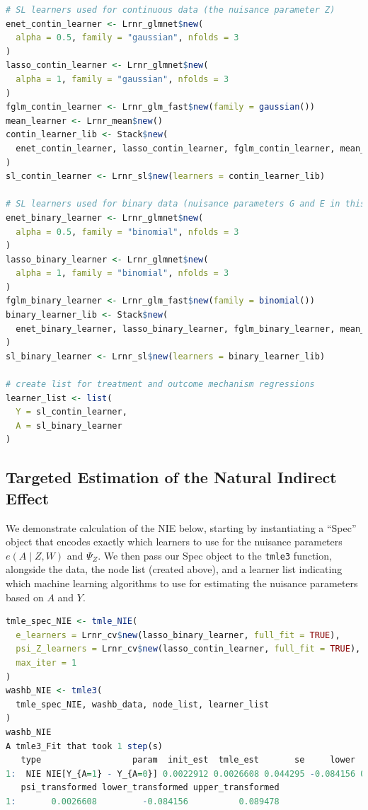 \documentclass[
  12pt, krantz2,
]{krantz}
\newcommand{\passthrough}[1]{#1}
\newcommand{\1}{\mathbbm{1}}
\theoremstyle{definition}
\theoremstyle{definition}
\theoremstyle{definition}
\theoremstyle{definition}
\theoremstyle{remark}
\begin{document}
\begin{lstlisting}[language=R]
# SL learners used for continuous data (the nuisance parameter Z)
enet_contin_learner <- Lrnr_glmnet$new(
  alpha = 0.5, family = "gaussian", nfolds = 3
)
lasso_contin_learner <- Lrnr_glmnet$new(
  alpha = 1, family = "gaussian", nfolds = 3
)
fglm_contin_learner <- Lrnr_glm_fast$new(family = gaussian())
mean_learner <- Lrnr_mean$new()
contin_learner_lib <- Stack$new(
  enet_contin_learner, lasso_contin_learner, fglm_contin_learner, mean_learner
)
sl_contin_learner <- Lrnr_sl$new(learners = contin_learner_lib)

# SL learners used for binary data (nuisance parameters G and E in this case)
enet_binary_learner <- Lrnr_glmnet$new(
  alpha = 0.5, family = "binomial", nfolds = 3
)
lasso_binary_learner <- Lrnr_glmnet$new(
  alpha = 1, family = "binomial", nfolds = 3
)
fglm_binary_learner <- Lrnr_glm_fast$new(family = binomial())
binary_learner_lib <- Stack$new(
  enet_binary_learner, lasso_binary_learner, fglm_binary_learner, mean_learner
)
sl_binary_learner <- Lrnr_sl$new(learners = binary_learner_lib)

# create list for treatment and outcome mechanism regressions
learner_list <- list(
  Y = sl_contin_learner,
  A = sl_binary_learner
)
\end{lstlisting}

\hypertarget{targeted-estimation-of-the-natural-indirect-effect}{%
\subsection{Targeted Estimation of the Natural Indirect Effect}\label{targeted-estimation-of-the-natural-indirect-effect}}

We demonstrate calculation of the NIE below, starting by instantiating a ``Spec''
object that encodes exactly which learners to use for the nuisance parameters
\(e(A \mid Z, W)\) and \(\Psi_Z\). We then pass our Spec object to the \passthrough{\lstinline!tmle3!}
function, alongside the data, the node list (created above), and a learner list
indicating which machine learning algorithms to use for estimating the nuisance
parameters based on \(A\) and \(Y\).

\begin{lstlisting}[language=R]
tmle_spec_NIE <- tmle_NIE(
  e_learners = Lrnr_cv$new(lasso_binary_learner, full_fit = TRUE),
  psi_Z_learners = Lrnr_cv$new(lasso_contin_learner, full_fit = TRUE),
  max_iter = 1
)
washb_NIE <- tmle3(
  tmle_spec_NIE, washb_data, node_list, learner_list
)
washb_NIE
A tmle3_Fit that took 1 step(s)
   type                  param  init_est  tmle_est       se     lower    upper
1:  NIE NIE[Y_{A=1} - Y_{A=0}] 0.0022912 0.0026608 0.044295 -0.084156 0.089478
   psi_transformed lower_transformed upper_transformed
1:       0.0026608         -0.084156          0.089478
\end{lstlisting}
\end{document}
